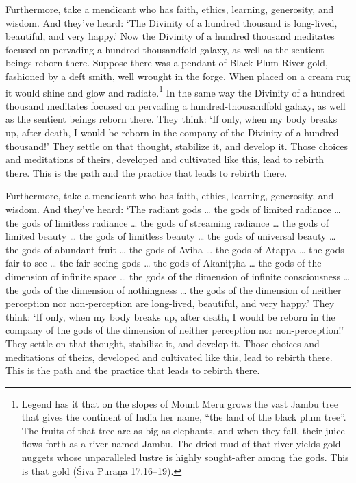 \documentclass[12pt,openany]{book}%
\begin{document}
Furthermore, take a mendicant who has faith, ethics, learning, generosity, and wisdom. And they’ve heard: ‘The Divinity of a hundred thousand is long-lived, beautiful, and very happy.’ Now the Divinity of a hundred thousand meditates focused on pervading a hundred-thousandfold galaxy, as well as the sentient beings reborn there. Suppose there was a pendant of Black Plum River gold, fashioned by a deft smith, well wrought in the forge. When placed on a cream rug it would shine and glow and radiate.\footnote{Legend has it that on the slopes of Mount Meru grows the vast Jambu tree that gives the continent of India her name, “the land of the black plum tree”. The fruits of that tree are as big as elephants, and when they fall, their juice flows forth as a river named Jambu. The dried mud of that river yields gold nuggets whose unparalleled lustre is highly sought-after among the gods. This is that gold (Śiva \textsanskrit{Purāṇa} 17.16–19). } In the same way the Divinity of a hundred thousand meditates focused on pervading a hundred-thousandfold galaxy, as well as the sentient beings reborn there. They think: ‘If only, when my body breaks up, after death, I would be reborn in the company of the Divinity of a hundred thousand!’ They settle on that thought, stabilize it, and develop it. Those choices and meditations of theirs, developed and cultivated like this, lead to rebirth there. This is the path and the practice that leads to rebirth there. 

Furthermore, take a mendicant who has faith, ethics, learning, generosity, and wisdom. And they’ve heard: ‘The radiant gods … the gods of limited radiance … the gods of limitless radiance … the gods of streaming radiance … the gods of limited beauty … the gods of limitless beauty … the gods of universal beauty … the gods of abundant fruit … the gods of Aviha … the gods of Atappa … the gods fair to see … the fair seeing gods … the gods of \textsanskrit{Akaniṭṭha} … the gods of the dimension of infinite space … the gods of the dimension of infinite consciousness … the gods of the dimension of nothingness … the gods of the dimension of neither perception nor non-perception are long-lived, beautiful, and very happy.’ They think: ‘If only, when my body breaks up, after death, I would be reborn in the company of the gods of the dimension of neither perception nor non-perception!’ They settle on that thought, stabilize it, and develop it. Those choices and meditations of theirs, developed and cultivated like this, lead to rebirth there. This is the path and the practice that leads to rebirth there. 
\end{document}
